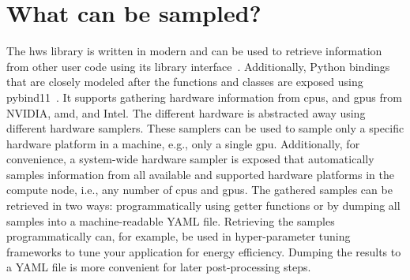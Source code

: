 \section{What can be sampled?}
\label{sec:hws_what}

The hws library is written in modern  and can be used to retrieve information from other user code using its library interface~\cite{breyer_hws_2024}. 
Additionally, Python bindings that are closely modeled after the \cpp functions and classes are exposed using pybind11~\cite{jakob_pybind11_2024}. 
It supports gathering hardware information from \glspl{cpu}, and \glspl{gpu} from NVIDIA, \gls{amd}, and Intel.  
The different hardware is abstracted away using different hardware samplers. 
These samplers can be used to sample only a specific hardware platform in a machine, e.g., only a single \gls{gpu}. 
Additionally, for convenience, a system-wide hardware sampler is exposed that automatically samples information from all available and supported hardware platforms in the compute node, i.e., any number of \glspl{cpu} and \glspl{gpu}. 
The gathered samples can be retrieved in two ways: programmatically using getter functions or by dumping all samples into a machine-readable YAML file. 
Retrieving the samples programmatically can, for example, be used in hyper-parameter tuning frameworks to tune your application for energy efficiency. 
Dumping the results to a YAML file is more convenient for later post-processing steps. 


